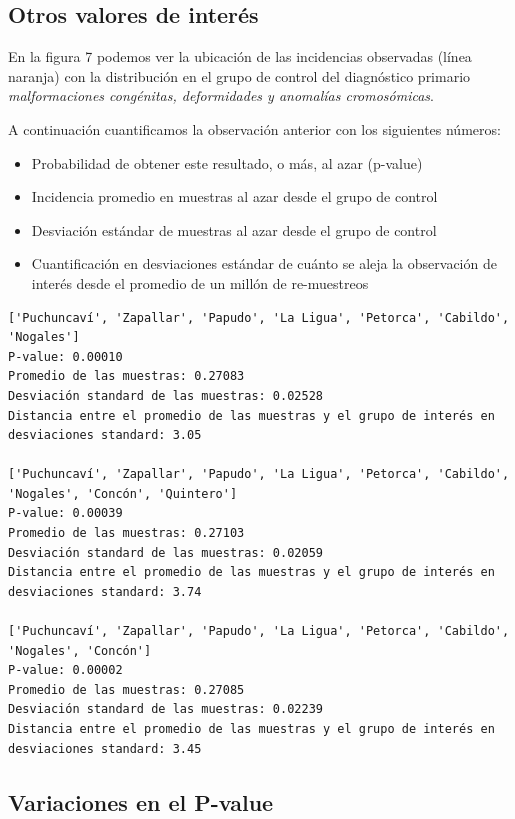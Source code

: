 \documentclass[]{article}
\providecommand{\tightlist}{%
  \setlength{\itemsep}{0pt}\setlength{\parskip}{0pt}}
\begin{document}
\hypertarget{otros-valores-de-interuxe9s}{%
\subsection{Otros valores de
interés}\label{otros-valores-de-interuxe9s}}

En la figura 7 podemos ver la ubicación de las incidencias observadas
(línea naranja) con la distribución en el grupo de control del
diagnóstico primario \emph{malformaciones congénitas, deformidades y
anomalías cromosómicas}.

A continuación cuantificamos la observación anterior con los siguientes
números:

\begin{itemize}
\tightlist
\item
  Probabilidad de obtener este resultado, o más, al azar (p-value)
\item
  Incidencia promedio en muestras al azar desde el grupo de control
\item
  Desviación estándar de muestras al azar desde el grupo de control
\item
  Cuantificación en desviaciones estándar de cuánto se aleja la
  observación de interés desde el promedio de un millón de re-muestreos
\end{itemize}

\begin{verbatim}
['Puchuncaví', 'Zapallar', 'Papudo', 'La Ligua', 'Petorca', 'Cabildo', 'Nogales']
P-value: 0.00010
Promedio de las muestras: 0.27083
Desviación standard de las muestras: 0.02528
Distancia entre el promedio de las muestras y el grupo de interés en desviaciones standard: 3.05

['Puchuncaví', 'Zapallar', 'Papudo', 'La Ligua', 'Petorca', 'Cabildo', 'Nogales', 'Concón', 'Quintero']
P-value: 0.00039
Promedio de las muestras: 0.27103
Desviación standard de las muestras: 0.02059
Distancia entre el promedio de las muestras y el grupo de interés en desviaciones standard: 3.74

['Puchuncaví', 'Zapallar', 'Papudo', 'La Ligua', 'Petorca', 'Cabildo', 'Nogales', 'Concón']
P-value: 0.00002
Promedio de las muestras: 0.27085
Desviación standard de las muestras: 0.02239
Distancia entre el promedio de las muestras y el grupo de interés en desviaciones standard: 3.45
\end{verbatim}

\hypertarget{variaciones-en-el-p-value}{%
\subsection{Variaciones en el P-value}\label{variaciones-en-el-p-value}}
\end{document}

